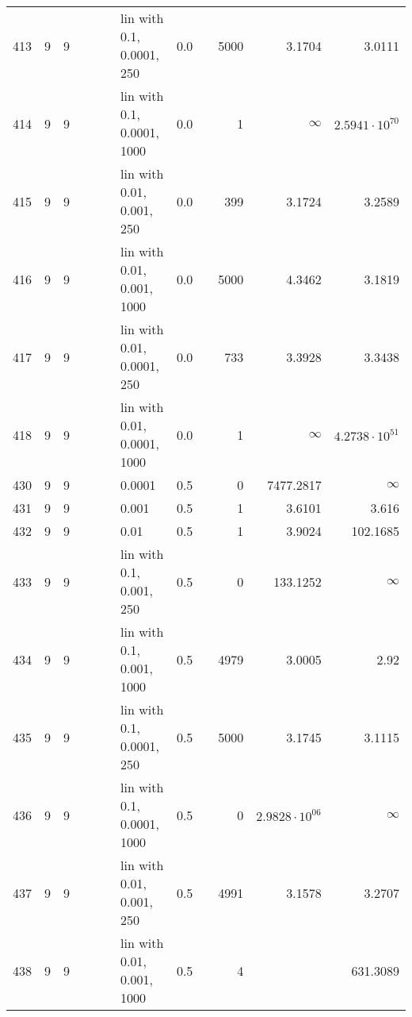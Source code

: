 \begin{longtable}{lrrrrrlrrrrr}
  413 &       9 & 9 &   &   &   &   lin with 0.1, 0.0001, 250 &      0.0 &        &    5000 &                 3.1704 &                 3.0111 \\
  414 &       9 & 9 &   &   &   &  lin with 0.1, 0.0001, 1000 &      0.0 &        &       1 &               $\infty$ &  $2.5941\cdot 10^{70}$ \\
  415 &       9 & 9 &   &   &   &   lin with 0.01, 0.001, 250 &      0.0 &        &     399 &                 3.1724 &                 3.2589 \\
  416 &       9 & 9 &   &   &   &  lin with 0.01, 0.001, 1000 &      0.0 &        &    5000 &                 4.3462 &                 3.1819 \\
  417 &       9 & 9 &   &   &   &  lin with 0.01, 0.0001, 250 &      0.0 &        &     733 &                 3.3928 &                 3.3438 \\
  418 &       9 & 9 &   &   &   & lin with 0.01, 0.0001, 1000 &      0.0 &        &       1 &               $\infty$ &  $4.2738\cdot 10^{51}$ \\
  430 &       9 & 9 &   &   &   &                      0.0001 &      0.5 &        &       0 &              7477.2817 &               $\infty$ \\
  431 &       9 & 9 &   &   &   &                       0.001 &      0.5 &        &       1 &                 3.6101 &                  3.616 \\
  432 &       9 & 9 &   &   &   &                        0.01 &      0.5 &        &       1 &                 3.9024 &               102.1685 \\
  433 &       9 & 9 &   &   &   &    lin with 0.1, 0.001, 250 &      0.5 &        &       0 &               133.1252 &               $\infty$ \\
  434 &       9 & 9 &   &   &   &   lin with 0.1, 0.001, 1000 &      0.5 &        &    4979 &                 3.0005 &                   2.92 \\
  435 &       9 & 9 &   &   &   &   lin with 0.1, 0.0001, 250 &      0.5 &        &    5000 &                 3.1745 &                 3.1115 \\
  436 &       9 & 9 &   &   &   &  lin with 0.1, 0.0001, 1000 &      0.5 &        &       0 &  $2.9828\cdot 10^{06}$ &               $\infty$ \\
  437 &       9 & 9 &   &   &   &   lin with 0.01, 0.001, 250 &      0.5 &        &    4991 &                 3.1578 &                 3.2707 \\
  438 &       9 & 9 &   &   &   &  lin with 0.01, 0.001, 1000 &      0.5 &        &       4 &                        &               631.3089 \\

\end{longtable}
